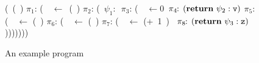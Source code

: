 \begin{figure}[t!]
\renewcommand{\arraystretch}{1}
\begin{minipage}{.40\textwidth}
  \small
  \renewcommand{\arraystretch}{1}{
    \begin{uprogram}
      \UFL(\DEFINE\ (\length~\xl)
        $\pi_1\!\!:\, $(\LET\ \px\ $\leftarrow $\ (\NULLQ~\xl) \IN
       \hspace*{.05cm} $\pi_2\!\!:\,$(\SIF\
      $\psi_1\!\!:\,$ \px
       \hspace*{.27cm} $\pi_3\!\!:\,
      $(\LET\ \pv\ $\leftarrow 0$\ \IN \hspace*{1.4mm}$\pi_4\!\!:\,(\mbox{$\mathbf{ return}$}~\psi_2:\mbox{\tt v})$
      \UNL{3} \hspace*{.29cm}    $\pi_5\!\!:\, $(\LET~\pu\
      $\leftarrow$  (\CDR~\xl)  \IN
      \UNL{4} \hspace*{.34cm}   $\pi_6\!\!:\, $(\LET~\py\
      $\leftarrow$  (\length~\pu)  \IN
      \UNL{5} \hspace*{.34cm} $\pi_7\!\!:\,
      $(\LET~\pz\ $\leftarrow$ (+~1~\py)\ \IN \hspace*{1.4mm} $\pi_8\!\!:\,
      (\mbox{$\mathbf{ return}$}~\psi_3:\mbox{\tt z})$)))))))
  \end{uprogram}}
\end{minipage}
\caption{An example program}\label{fig:mot-example2-a}
\vspace*{-5mm}
\end{figure}

